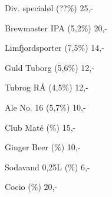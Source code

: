 \documentclass{article}
\begin{document}

\maketitle

\null
\vspace{-0.8cm}


\vspace{0.3cm}

Div. specialøl {\large (??\%)}  \hfill 25,-

\vspace{0.3cm}

Brewmaster IPA {\large (5,2\%)} \hfill 20,-

\vspace{1.3cm}

Limfjordsporter {\large (7,5\%)}  \hfill 14,-





\vspace{1.3cm}

Guld Tuborg {\large (5,6\%)} \hfill 12,-

\vspace{0.3cm}

Tubrog RÅ {\large (4,5\%)} \hfill 12,-

\vspace{0.3cm}

Ale No. 16 {\large (5,7\%)} \hfill 10,-

\vspace{1.3cm}

Club Maté {\large (\frownie{}\%)} \hfill 15,-

\vspace{0.3cm}

Ginger Beer {\large (\frownie{}\%)} \hfill 10,-

\vspace{0.3cm}

Sodavand 0,25L {\large (\frownie{}\%)}  \hfill 6,-

\vspace{0.3cm}

Cocio {\large (\frownie{}\%)}  \hfill 20,-

\vspace{0.5cm}

\underskriv
\end{document}
